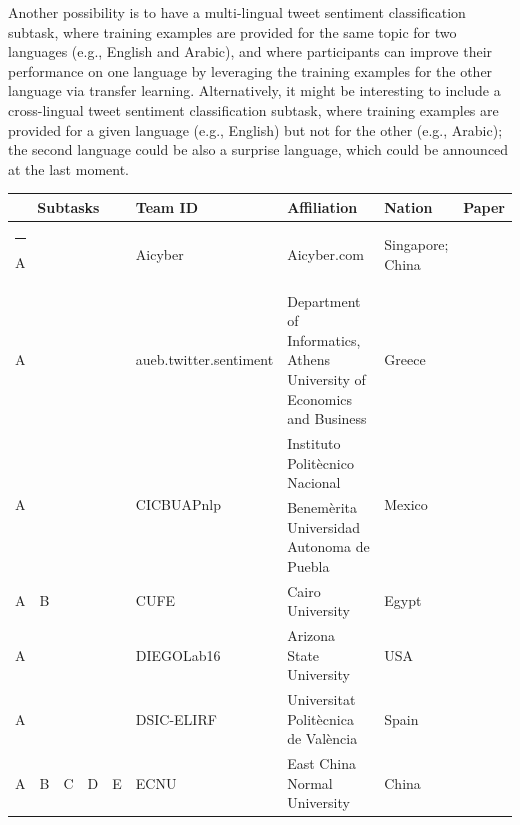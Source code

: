 \documentclass[11pt,letterpaper]{article}
\begin{document}
Another possibility is to have a multi-lingual tweet sentiment
classification subtask, where training examples are provided for the
same topic for two languages (e.g., English and Arabic), and where
participants can improve their performance on one language by
leveraging the training examples for the other language via transfer
learning. Alternatively, it might be interesting to include a
cross-lingual tweet sentiment classification subtask, where training
examples are provided for a given language (e.g., English) but not for
the other (e.g., Arabic); the second language could be also a surprise
language, which could be announced at the last moment.


\begin{table}[htb]
  \begin{center}
    \resizebox{\textwidth}{!} {
    \begin{tabular}{|ccccc|l|l|l|l|}
      \hline
      \multicolumn{5}{|c|}{\textbf{Subtasks}} & \textbf{Team ID} & \textbf{Affiliation} & \textbf{Nation} & \textbf{Paper} \\ \hline 
      \hline \rule[0ex]{-1mm}{2ex} 
      A & & & & & Aicyber & Aicyber.com & Singapore; China & \cite{SemEval:2016:task4:Aicyber} \\ \hline
      A & & & & & aueb.twitter.sentiment & Department of Informatics, Athens University of Economics and Business & Greece &\cite{SemEval:2016:task4:aueb.twitter.sentiment} \\ \hline 
      \multirow{2}{*}{A} & & & & & \multirow{2}{*}{CICBUAPnlp} & Instituto Politècnico Nacional & \multirow{2}{*}{Mexico} & \multirow{2}{*}{\cite{SemEval:2016:task4:CICBUAPnlp}} \\ 
      & & & & & & Benemèrita Universidad Autonoma de Puebla & & \\ \hline 
      A & B & & & & CUFE & Cairo University & Egypt & \cite{SemEval:2016:task4:CUFE} \\ \hline 
      A & & & & & DIEGOLab16 & Arizona State University & USA & \cite{SemEval:2016:task4:DIEGOLab16} \\ \hline 
      A & & & & & DSIC-ELIRF & Universitat Politècnica de València & Spain & \cite{SemEval:2016:task4:DSIC-ELIRF} \\ \hline 
      A & B & C & D & E & ECNU & East China Normal University & China & \cite{SemEval:2016:task4:ECNU} \\ \hline 

\end{tabular}}
\end{center}
\end{table}
\end{document}
